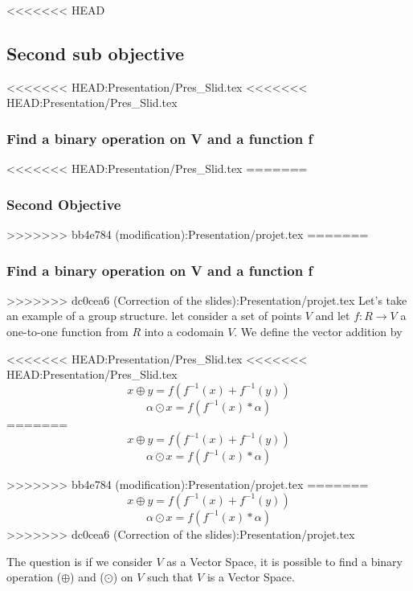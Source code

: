 \documentclass{beamer}
\begin{document}
\begin{frame}
\begin{frame}
\begin{frame}
\begin{frame}
\begin{frame}

    
\end{frame}
<<<<<<< HEAD
\subsection{Second sub objective}
\begin{frame}
<<<<<<< HEAD:Presentation/Pres_Slid.tex
<<<<<<< HEAD:Presentation/Pres_Slid.tex
    \frametitle{Find a binary operation on V and a function f }
<<<<<<< HEAD:Presentation/Pres_Slid.tex
=======
    \frametitle{Second Objective}
>>>>>>> bb4e784 (modification):Presentation/projet.tex
=======
    \frametitle{Find a binary operation on V and a function f }
>>>>>>> dc0cea6 (Correction of the slides):Presentation/projet.tex
	Let's take an example of a group structure.
	let consider a set of points  $ V $ and let  $ f: R \rightarrow V $ a one-to-one
	function from $R$ into a codomain $V$. We define the vector addition by
	
<<<<<<< HEAD:Presentation/Pres_Slid.tex
<<<<<<< HEAD:Presentation/Pres_Slid.tex
    $$ x \oplus y = f(f^{-1}(x) + f^{-1}(y)) $$
    $$ \alpha \odot x = f(f^{-1}(x) * \alpha) $$
=======
     $$ x \oplus y = f(f^{-1}(x) + f^{-1}(y)) $$
     $$ \alpha \odot x = f(f^{-1}(x) * \alpha) $$
		
>>>>>>> bb4e784 (modification):Presentation/projet.tex
=======
    $$ x \oplus y = f(f^{-1}(x) + f^{-1}(y)) $$
    $$ \alpha \odot x = f(f^{-1}(x) * \alpha) $$
>>>>>>> dc0cea6 (Correction of the slides):Presentation/projet.tex

	The question is if we consider $V$ as a Vector Space, it is possible to find a binary operation ($\oplus$) and ($\odot$) on $V$ such that $V$ is a Vector Space.
	

\end{frame}
\end{frame}
\end{frame}
\end{frame}
\end{frame}
\end{document}

